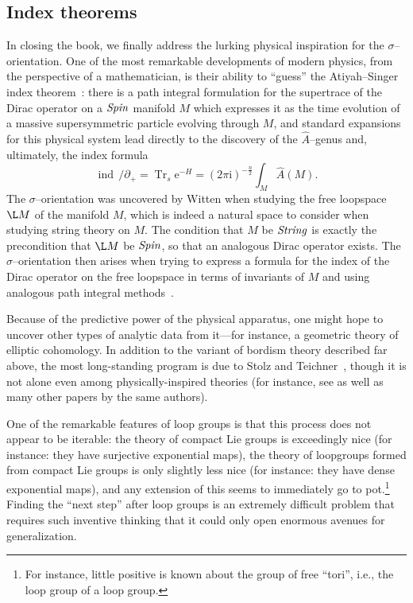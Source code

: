 \subsection*{Index theorems}

In closing the book, we finally address the lurking physical inspiration for the \(\sigma\)--orientation.  One of the most remarkable developments of modern physics, from the perspective of a mathematician, is their ability to ``guess'' the Atiyah--Singer index theorem~\cite[Section 8.6]{Takhtajan}: there is a path integral formulation for the supertrace of the Dirac operator on a \(\mathit{Spin}\) manifold \(M\) which expresses it as the time evolution of a massive supersymmetric particle evolving through \(M\), and standard expansions for this physical system lead directly to the discovery of the \(\widehat A\)--genus and, ultimately, the index formula \[\operatorname{ind}\, /\!\!\!\partial_+ = \operatorname{Tr}_s \mathrm e^{-H} = (2 \pi \mathrm i)^{-\frac{n}{2}} \int_M \widehat A(M).\]  The \(\sigma\)--orientation was uncovered by Witten when studying the free loopspace \(\L M\) of the manifold \(M\), which is indeed a natural space to consider when studying string theory on \(M\).  The condition that \(M\) be \(\mathit{String}\) is exactly the precondition that \(\L M\) be \(\mathit{Spin}\), so that an analogous Dirac operator exists.  The \(\sigma\)--orientation then arises when trying to express a formula for the index of the Dirac operator on the free loopspace in terms of invariants of \(M\) and using analogous path integral methods~\cite{SegalEll}.

Because of the predictive power of the physical apparatus, one might hope to uncover other types of analytic data from it---for instance, a geometric theory of elliptic cohomology.  In addition to the variant of bordism theory described far above, the most long-standing program is due to Stolz and Teichner~\cite{StolzTeichnerWhatIs,StolzTeichnerSusy}, though it is not alone even among physically-inspired theories (for instance, see \cite{DouglasHenriques} as well as many other papers by the same authors).

One of the remarkable features of loop groups is that this process does not appear to be iterable: the theory of compact Lie groups is exceedingly nice (for instance: they have surjective exponential maps), the theory of loopgroups formed from compact Lie groups is only slightly less nice (for instance: they have dense exponential maps), and any extension of this seems to immediately go to pot.\footnote{For instance, little positive is known about the group of free ``tori'', i.e., the loop group of a loop group.}  Finding the ``next step'' after loop groups is an extremely difficult problem that requires such inventive thinking that it could only open enormous avenues for generalization.








